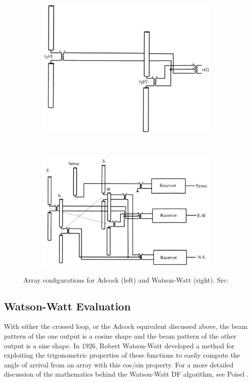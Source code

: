 \begin{figure}
  \centering
  \begin{subfigure}[b]{0.4\textwidth}
    \includegraphics[width=\textwidth]{./img/lit_review/adcock}
  \end{subfigure}
  ~
  \begin{subfigure}[b]{0.5\textwidth}
    \includegraphics[width=\textwidth]{./img/lit_review/watson_watt}
  \end{subfigure}
  \caption{Array configurations for Adcock (left) and Watson-Watt (right). Src: \cite{poisel2008introduction}}
  \label{fig:lit_adcock_and_watsonwatt}
\end{figure}

\subsection{Watson-Watt Evaluation}
With either the crossed loop, or the Adcock equivalent discussed above, the beam pattern of the one output is a cosine shape and the beam pattern of the other output is a sine shape. 
In 1926, Robert Watson-Watt developed a method for exploiting the trigonometric properties of these functions to easily compute the angle of arrival from an array with this cos/sin property. For a more detailed discussion of the mathematics behind the Watson-Watt DF algorithm, see Poisel \cite{poisel2008introduction}.

